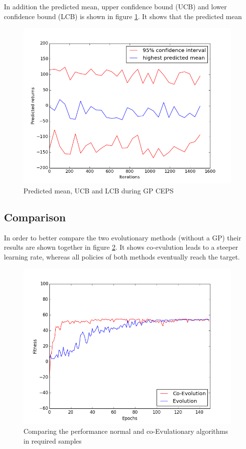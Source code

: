 In addition the predicted mean, upper confidence bound (UCB) and lower confidence bound (LCB) is shown in figure \ref{pred_img}. It shows that the predicted mean 

\begin{figure}[ht]
  \centering
  \includegraphics[scale=0.5]{images/GPCEPS_pred.png}
  \caption{Predicted mean, UCB and LCB during GP CEPS}\label{pred_img}
\end{figure}


\subsection{Comparison}\label{comparisonSectiona}
In order to better compare the two evolutionary methods (without a GP) their results are shown together in figure \ref{compare_img}. It shows co-evulution leads to a steeper learning rate, whereas all policies of both methods eventually reach the target.

\begin{figure}[ht]
  \centering
  \includegraphics[scale=0.5]{images/together.png}
  \caption{Comparing the performance normal and co-Evulationary algorithms in required samples}\label{compare_img}
\end{figure}


